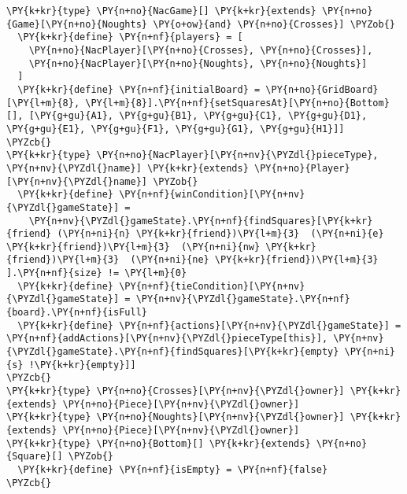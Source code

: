 \begin{Verbatim}[commandchars=\\\{\}]
\PY{k+kr}{type} \PY{n+no}{NacGame}[] \PY{k+kr}{extends} \PY{n+no}{Game}[\PY{n+no}{Noughts} \PY{o+ow}{and} \PY{n+no}{Crosses}] \PYZob{}
  \PY{k+kr}{define} \PY{n+nf}{players} = [
    \PY{n+no}{NacPlayer}[\PY{n+no}{Crosses}, \PY{n+no}{Crosses}],
    \PY{n+no}{NacPlayer}[\PY{n+no}{Noughts}, \PY{n+no}{Noughts}]
  ]
  \PY{k+kr}{define} \PY{n+nf}{initialBoard} = \PY{n+no}{GridBoard}[\PY{l+m}{8}, \PY{l+m}{8}].\PY{n+nf}{setSquaresAt}[\PY{n+no}{Bottom}[], [\PY{g+gu}{A1}, \PY{g+gu}{B1}, \PY{g+gu}{C1}, \PY{g+gu}{D1}, \PY{g+gu}{E1}, \PY{g+gu}{F1}, \PY{g+gu}{G1}, \PY{g+gu}{H1}]]
\PYZcb{}
\PY{k+kr}{type} \PY{n+no}{NacPlayer}[\PY{n+nv}{\PYZdl{}pieceType}, \PY{n+nv}{\PYZdl{}name}] \PY{k+kr}{extends} \PY{n+no}{Player}[\PY{n+nv}{\PYZdl{}name}] \PYZob{}
  \PY{k+kr}{define} \PY{n+nf}{winCondition}[\PY{n+nv}{\PYZdl{}gameState}] =
    \PY{n+nv}{\PYZdl{}gameState}.\PY{n+nf}{findSquares}[\PY{k+kr}{friend} (\PY{n+ni}{n} \PY{k+kr}{friend})\PY{l+m}{3}  (\PY{n+ni}{e} \PY{k+kr}{friend})\PY{l+m}{3}  (\PY{n+ni}{nw} \PY{k+kr}{friend})\PY{l+m}{3}  (\PY{n+ni}{ne} \PY{k+kr}{friend})\PY{l+m}{3} ].\PY{n+nf}{size} != \PY{l+m}{0}
  \PY{k+kr}{define} \PY{n+nf}{tieCondition}[\PY{n+nv}{\PYZdl{}gameState}] = \PY{n+nv}{\PYZdl{}gameState}.\PY{n+nf}{board}.\PY{n+nf}{isFull}
  \PY{k+kr}{define} \PY{n+nf}{actions}[\PY{n+nv}{\PYZdl{}gameState}] = \PY{n+nf}{addActions}[\PY{n+nv}{\PYZdl{}pieceType[this}], \PY{n+nv}{\PYZdl{}gameState}.\PY{n+nf}{findSquares}[\PY{k+kr}{empty} \PY{n+ni}{s} !\PY{k+kr}{empty}]]
\PYZcb{}
\PY{k+kr}{type} \PY{n+no}{Crosses}[\PY{n+nv}{\PYZdl{}owner}] \PY{k+kr}{extends} \PY{n+no}{Piece}[\PY{n+nv}{\PYZdl{}owner}]
\PY{k+kr}{type} \PY{n+no}{Noughts}[\PY{n+nv}{\PYZdl{}owner}] \PY{k+kr}{extends} \PY{n+no}{Piece}[\PY{n+nv}{\PYZdl{}owner}]
\PY{k+kr}{type} \PY{n+no}{Bottom}[] \PY{k+kr}{extends} \PY{n+no}{Square}[] \PYZob{}
  \PY{k+kr}{define} \PY{n+nf}{isEmpty} = \PY{n+nf}{false}
\PYZcb{}
\end{Verbatim}
